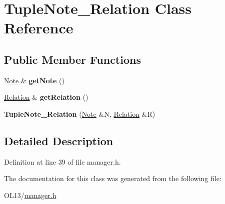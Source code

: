\hypertarget{class_tuple_note___relation}{}\section{Tuple\+Note\+\_\+\+Relation Class Reference}
\label{class_tuple_note___relation}
\subsection*{Public Member Functions}
\begin{DoxyCompactItemize}
\item 
\mbox{\label{class_tuple_note___relation_a2bb8e84363d2bab8cd03742144a06ef9}} 
\hyperlink{class_note}{Note} \& {\bfseries get\+Note} ()
\item 
\mbox{\label{class_tuple_note___relation_a0e6d2fca79e715c85d4a4793da2bb381}} 
\hyperlink{class_relation}{Relation} \& {\bfseries get\+Relation} ()
\item 
\mbox{\label{class_tuple_note___relation_adc3d9a6e637361eedd2e561ae957e1fb}} 
{\bfseries Tuple\+Note\+\_\+\+Relation} (\hyperlink{class_note}{Note} \&N, \hyperlink{class_relation}{Relation} \&R)
\end{DoxyCompactItemize}


\subsection{Detailed Description}


Definition at line 39 of file manager.\+h.



The documentation for this class was generated from the following file\+:\begin{DoxyCompactItemize}
\item 
O\+L13/\hyperlink{manager_8h}{manager.\+h}\end{DoxyCompactItemize}
